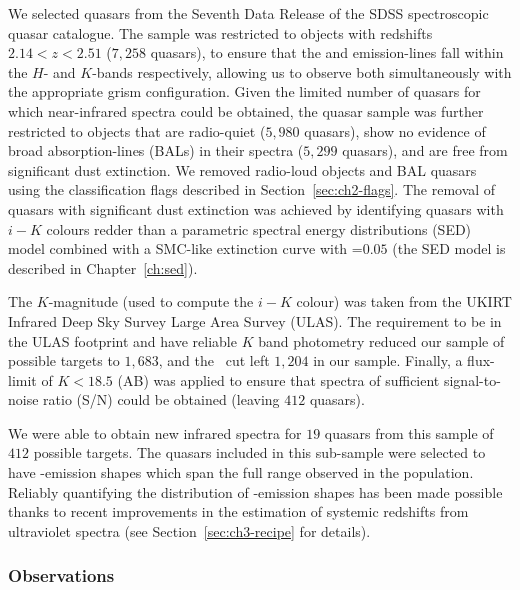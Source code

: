 We selected quasars from the Seventh Data Release \citep[DR7;][]{schneider10} of the SDSS spectroscopic quasar catalogue.  
The sample was restricted to objects with redshifts $2.14 < z <2.51$ ($7,258$ quasars), to ensure that the \hb and \ha emission-lines fall within the $H$- and $K$-bands respectively, allowing us to observe both simultaneously with the appropriate grism configuration.
Given the limited number of quasars for which near-infrared spectra could be obtained, the quasar sample was further restricted to objects that are radio-quiet ($5,980$ quasars), show no evidence of broad absorption-lines (BALs) in their spectra ($5,299$ quasars), and are free from significant dust extinction. 
We removed radio-loud objects and BAL quasars using the classification flags described in Section~\ref{sec:ch2-flags}. 
The removal of quasars with significant dust extinction was achieved by identifying quasars with $i-K$ colours redder than a parametric spectral energy distributions (SED) model combined with a SMC-like extinction curve with \ebv=$0.05$ (the SED model is described in Chapter~\ref{ch:sed}). 

The $K$-magnitude (used to compute the $i-K$ colour) was taken from the UKIRT Infrared Deep Sky Survey \citep[UKIDSS;][]{lawrence07} Large Area Survey (ULAS). 
The requirement to be in the ULAS footprint and have reliable $K$ band photometry reduced our sample of possible targets to $1,683$, and the \ebv\, cut left $1,204$ in our sample. 
Finally, a flux-limit of $K<18.5$ (AB) was applied to ensure that spectra of sufficient signal-to-noise ratio (S/N) could be obtained (leaving $412$ quasars). 
 
We were able to obtain new infrared spectra for $19$ quasars from this sample of $412$ possible targets. 
The quasars included in this sub-sample were selected to have -emission shapes which span the full range observed in the population. 
Reliably quantifying the distribution of -emission shapes has been made possible thanks to recent improvements in the estimation of systemic redshifts from ultraviolet spectra (see Section~\ref{sec:ch3-recipe} for details). 

\subsubsection{Observations}

